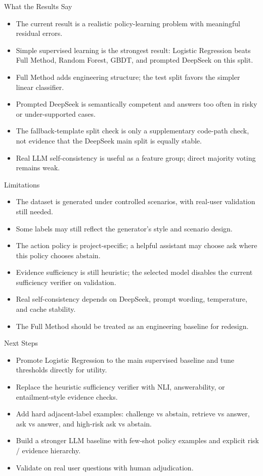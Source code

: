 \documentclass[aspectratio=169,10pt]{beamer}
\begin{document}
\begin{frame}{What the Results Say}
  \begin{itemize}
    \item The current result is a realistic policy-learning problem with meaningful residual errors.
    \item Simple supervised learning is the strongest result: Logistic Regression beats Full Method, Random Forest, GBDT, and prompted DeepSeek on this split.
    \item Full Method adds engineering structure; the test split favors the simpler linear classifier.
    \item Prompted DeepSeek is semantically competent and answers too often in risky or under-supported cases.
    \item The fallback-template split check is only a supplementary code-path check, not evidence that the DeepSeek main split is equally stable.
    \item Real LLM self-consistency is useful as a feature group; direct majority voting remains weak.
  \end{itemize}
\end{frame}

\begin{frame}{Limitations}
  \begin{itemize}
    \item The dataset is generated under controlled scenarios, with real-user validation still needed.
    \item Some labels may still reflect the generator's style and scenario design.
    \item The action policy is project-specific; a helpful assistant may choose ask where this policy chooses abstain.
    \item Evidence sufficiency is still heuristic; the selected model disables the current sufficiency verifier on validation.
    \item Real self-consistency depends on DeepSeek, prompt wording, temperature, and cache stability.
    \item The Full Method should be treated as an engineering baseline for redesign.
  \end{itemize}
\end{frame}

\begin{frame}{Next Steps}
  \begin{itemize}
    \item Promote Logistic Regression to the main supervised baseline and tune thresholds directly for utility.
    \item Replace the heuristic sufficiency verifier with NLI, answerability, or entailment-style evidence checks.
    \item Add hard adjacent-label examples: challenge vs abstain, retrieve vs answer, ask vs answer, and high-risk ask vs abstain.
    \item Build a stronger LLM baseline with few-shot policy examples and explicit risk / evidence hierarchy.
    \item Validate on real user questions with human adjudication.
  \end{itemize}
\end{frame}
\end{document}
